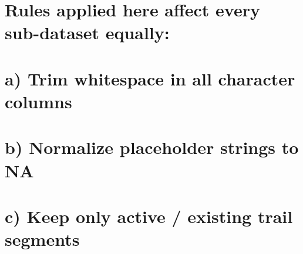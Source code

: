 \documentclass[
]{article}
\begin{document}
\section{Rules applied here affect every sub-dataset
equally:}\label{rules-applied-here-affect-every-sub-dataset-equally}

\section{a) Trim whitespace in all character
columns}\label{a-trim-whitespace-in-all-character-columns}

\section{b) Normalize placeholder strings to
NA}\label{b-normalize-placeholder-strings-to-na}

\section{c) Keep only active / existing trail
segments}\label{c-keep-only-active-existing-trail-segments}
\end{document}
